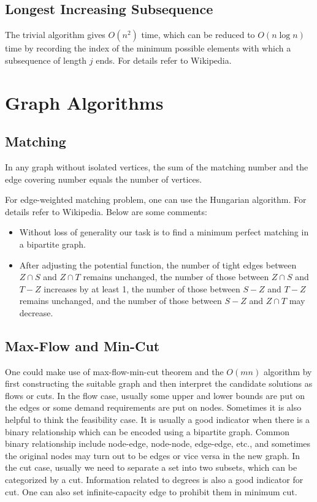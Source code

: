 \documentclass[openany]{book}
\begin{document}
\section{Longest Increasing Subsequence}
The trivial algorithm gives $O(n^2)$ time, which can be reduced to $O(n\log n)$ time by recording the index of the minimum possible elements with which a subsequence of length $j$ ends. For details refer to Wikipedia.

\chapter{Graph Algorithms}
\section{Matching}
In any graph without isolated vertices, the sum of the matching number and the edge covering number equals the number of vertices.

For edge-weighted matching problem, one can use the Hungarian algorithm. For details refer to Wikipedia. Below are some comments:
\begin{itemize}
\item Without loss of generality our task is to find a minimum perfect matching in a bipartite graph.
\item After adjusting the potential function, the number of tight edges between $Z\cap S$ and $Z\cap T$ remains unchanged, the number of those between $Z\cap S$ and $T-Z$ increases by at least 1, the number of those between $S-Z$ and $T-Z$ remains unchanged, and the number of those between $S-Z$ and $Z\cap T$ may decrease.
\end{itemize}

\section{Max-Flow and Min-Cut}
One could make use of max-flow-min-cut theorem and the $O(mn)$ algorithm by first constructing the suitable graph and then interpret the candidate solutions as flows or cuts. In the flow case, usually some upper and lower bounds are put on the edges or some demand requirements are put on nodes. Sometimes it is also helpful to think the feasibility case. It is usually a good indicator when there is a binary relationship which can be encoded using a bipartite graph. Common binary relationship include node-edge, node-node, edge-edge, etc., and sometimes the original nodes may turn out to be edges or vice versa in the new graph. In the cut case, usually we need to separate a set into two subsets, which can be categorized by a cut. Information related to degrees is also a good indicator for cut. One can also set infinite-capacity edge to prohibit them in minimum cut.
\end{document}

